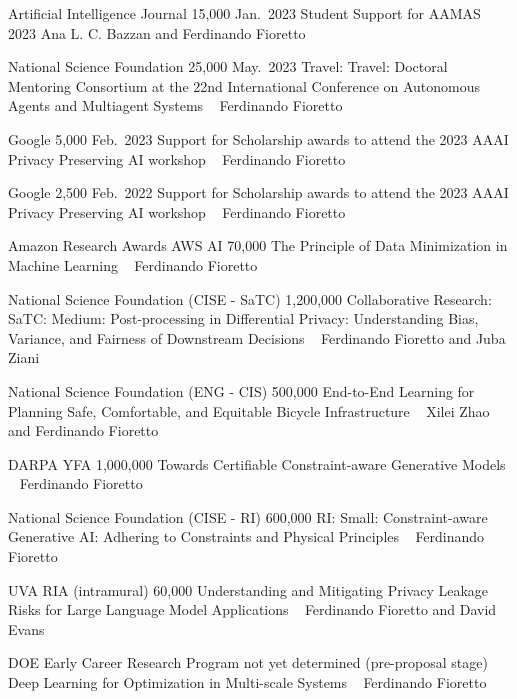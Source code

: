 \vspace{-16pt}

\begin{projects}
	\grantentrySinglePI
	{Artificial Intelligence Journal}
	{15,000}
	{Jan.~2023}{}
	{Student Support for AAMAS 2023}
	{}
	{Ana L. C. Bazzan and Ferdinando Fioretto}

	\grantentrySinglePI
	{National Science Foundation}
	{25,000}
	{May.~2023}{}
	{Travel: Travel: Doctoral Mentoring Consortium at the 22nd International Conference on Autonomous Agents and Multiagent Systems}
	{~}
	{Ferdinando Fioretto}

	\grantentrySinglePI
	{Google}
	{5,000}
	{Feb.~2023}{}
	{Support for Scholarship awards to attend the 2023 AAAI Privacy Preserving AI workshop}
	{~}
	{Ferdinando Fioretto}

	\grantentrySinglePI
	{Google}
	{2,500}
	{Feb.~2022}{}
	{Support for Scholarship awards to attend the 2023 AAAI Privacy Preserving AI workshop}
	{~}
	{Ferdinando Fioretto}
\end{projects}

\begin{projects}
	\grantentrySinglePI
	{Amazon Research Awards AWS AI}
	{70,000}
	{}{}
	{The Principle of Data Minimization in Machine Learning}
	{~}
	{Ferdinando Fioretto}

	\grantentrySinglePI
	{National Science Foundation (CISE - SaTC)}
	{1,200,000}
	{}{}
	{Collaborative Research: SaTC: Medium: Post-processing in Differential Privacy: 
	Understanding Bias, Variance, and Fairness of Downstream Decisions}
	{~}
	{Ferdinando Fioretto and Juba Ziani}

	\grantentrySinglePI
	{National Science Foundation (ENG - CIS)}
	{500,000}
	{}{}
	{End-to-End Learning for Planning Safe, Comfortable, and Equitable Bicycle Infrastructure}
	{~}
	{Xilei Zhao and Ferdinando Fioretto}

	\grantentrySinglePI
	{DARPA YFA}
	{1,000,000}
	{}{}
	{Towards Certifiable Constraint-aware Generative Models}
	{~}
	{Ferdinando Fioretto}

	\grantentrySinglePI
	{National Science Foundation (CISE - RI)}
	{600,000}
	{}{}
	{RI: Small: Constraint-aware Generative AI: Adhering to Constraints and Physical Principles}
	{~}
	{Ferdinando Fioretto}
	
	\grantentrySinglePI
	{UVA RIA (intramural)}
	{60,000}
	{}{}
	{Understanding and Mitigating Privacy Leakage Risks for Large Language Model Applications}
	{~}
	{Ferdinando Fioretto and David Evans}

	\grantentrySinglePI
	{DOE Early Career Research Program}
	{not yet determined}
	{}{}
	{(pre-proposal stage) Deep Learning for Optimization in Multi-scale Systems}
	{~}
	{Ferdinando Fioretto}
	
	
\end{projects}
